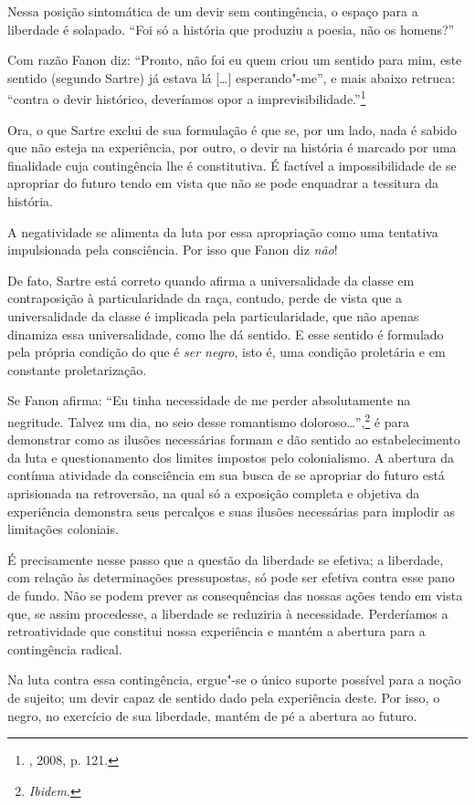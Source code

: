 Nessa posição sintomática de um devir sem contingência, o espaço para a
liberdade é solapado. ``Foi só a história que produziu a poesia, não os
homens?''

Com razão Fanon diz: ``Pronto, não foi eu quem criou um sentido para
mim, este sentido (segundo Sartre) já estava lá {[}\ldots{}{]}
esperando"-me'', e mais abaixo retruca: ``contra o devir histórico,
deveríamos opor a imprevisibilidade.''\footnote{, 2008, p. 121.}

Ora, o que Sartre exclui de sua formulação é que se, por um lado, nada é
sabido que não esteja na experiência, por outro, o devir na história é
marcado por uma finalidade cuja contingência lhe é constitutiva.
É factível a impossibilidade de
se apropriar do futuro tendo em vista que não se pode enquadrar a
tessitura da história.

A negatividade se alimenta da luta por essa apropriação como uma
tentativa impulsionada pela consciência. Por isso que Fanon diz
\emph{não}!

De fato, Sartre está correto quando afirma a universalidade da classe em
contraposição à particularidade da raça, contudo, perde de vista que a
universalidade da classe é implicada pela particularidade, que não
apenas dinamiza essa universalidade, como lhe dá sentido. E esse sentido
é formulado pela própria condição do que é \emph{ser negro}, isto é, uma
condição proletária e em constante proletarização.

Se Fanon afirma: ``Eu tinha necessidade de me perder absolutamente na
negritude. Talvez um dia, no seio desse romantismo
doloroso\ldots{}'',\footnote{\emph{Ibidem}.} é para demonstrar como as ilusões
necessárias formam e dão sentido ao estabelecimento da luta e
questionamento dos limites impostos pelo colonialismo. A abertura da
contínua atividade da consciência em sua busca de se apropriar do futuro
está aprisionada na retroversão, na qual só a exposição completa e
objetiva da experiência demonstra seus percalços e suas ilusões
necessárias para implodir as limitações coloniais.

É precisamente nesse passo que a questão da liberdade se efetiva; a
liberdade, com relação às determinações pressupostas, só pode ser
efetiva contra esse pano de fundo. Não se podem prever as consequências
das nossas ações tendo em vista que, se assim procedesse, a liberdade se
reduziria à necessidade. Perderíamos a retroatividade que constitui
nossa experiência e mantém a abertura para a contingência radical.

Na luta contra essa contingência, ergue"-se o único suporte possível para
a noção de sujeito; um devir capaz de sentido dado pela experiência
deste. Por isso, o negro, no exercício de sua liberdade, mantém de pé a
abertura ao futuro.

